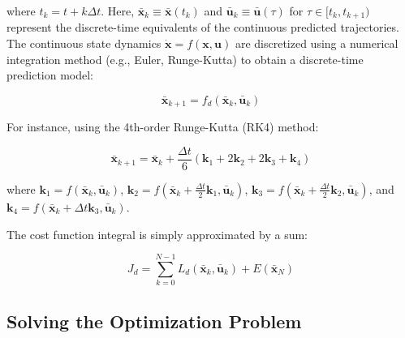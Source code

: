 where $t_k = t + k\Delta t$. Here, $\boldsymbol{\bar{x}}_k \equiv \boldsymbol{\bar{x}}(t_k)$ and $\mathbf{\bar{u}}_k \equiv \mathbf{\bar{u}}(\tau)$ for $\tau \in [t_k, t_{k+1})$ represent the discrete-time equivalents of the continuous predicted trajectories. The continuous state dynamics $\dot{\boldsymbol{x}} = f(\boldsymbol{x}, \mathbf{u})$ are discretized using a numerical integration method (e.g., Euler, Runge-Kutta) to obtain a discrete-time prediction model:

\begin{equation}
    \boldsymbol{\bar{x}}_{k+1} = f_d(\boldsymbol{\bar{x}}_k, \mathbf{\bar{u}}_k)
\end{equation}

For instance, using the 4th-order Runge-Kutta (RK4) method:

\begin{equation}
    \boldsymbol{\bar{x}}_{k+1} = \boldsymbol{\bar{x}}_k + \frac{\Delta t}{6}(\mathbf{k}_1 + 2\mathbf{k}_2 + 2\mathbf{k}_3 + \mathbf{k}_4)
\end{equation}

where $\mathbf{k}_1 = f(\boldsymbol{\bar{x}}_k, \mathbf{\bar{u}}_k)$, $\mathbf{k}_2 = f(\boldsymbol{\bar{x}}_k + \frac{\Delta t}{2}\mathbf{k}_1, \mathbf{\bar{u}}_k)$, $\mathbf{k}_3 = f(\boldsymbol{\bar{x}}_k + \frac{\Delta t}{2}\mathbf{k}_2, \mathbf{\bar{u}}_k)$, and $\mathbf{k}_4 = f(\boldsymbol{\bar{x}}_k + \Delta t \mathbf{k}_3, \mathbf{\bar{u}}_k)$.

The cost function integral is simply approximated by a sum:

\begin{equation}
    J_d = \sum_{k=0}^{N-1} L_d(\boldsymbol{\bar{x}}_k, \mathbf{\bar{u}}_k) + E(\boldsymbol{\bar{x}}_N)
\end{equation}


\subsection{Solving the Optimization Problem}

